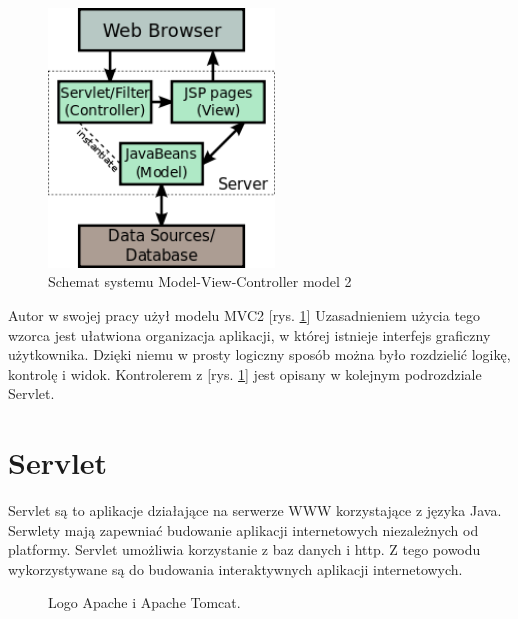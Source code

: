 \documentclass[eng,printmode,oneside]{mgr}
\begin{document}
\begin{figure}[ht!]
\centering
\includegraphics[width=60mm]{jspModel.png}
\caption{Schemat systemu Model-View-Controller model 2\cite{java.mvc.grafika}}
\label{fig:MVC2}
\end{figure}

Autor w swojej pracy użył modelu MVC2 [rys. \ref{fig:MVC2}]
Uzasadnieniem użycia tego wzorca jest ułatwiona organizacja aplikacji, w której
istnieje interfejs graficzny użytkownika. Dzięki niemu w prosty logiczny sposób
można było rozdzielić logikę, kontrolę i widok. Kontrolerem z [rys.
\ref{fig:MVC2}] jest opisany w kolejnym podrozdziale Servlet.

\newpage
\section{Servlet}

Servlet są to aplikacje działające na serwerze WWW korzystające z języka Java.
Serwlety mają zapewniać budowanie aplikacji internetowych niezależnych od
platformy. Servlet umożliwia korzystanie z baz danych i http. Z tego powodu
wykorzystywane są do budowania interaktywnych aplikacji internetowych. 

\begin{figure}
\centering
{}
\caption{\label{fig:apache}Logo Apache i Apache Tomcat.}
\vspace{-35pt}
\end{figure}
\end{document}
